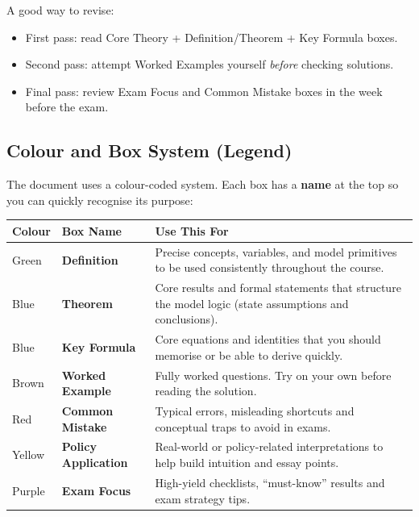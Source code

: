 \documentclass[12pt]{article}
\begin{document}
A good way to revise:
\begin{itemize}
\item First pass: read Core Theory + Definition/Theorem + Key Formula boxes.
\item Second pass: attempt Worked Examples yourself \emph{before} checking solutions.
\item Final pass: review Exam Focus and Common Mistake boxes in the week before the exam.
\end{itemize}

\subsection*{Colour and Box System (Legend)}

The document uses a colour-coded system. Each box has a \textbf{name} at the top so you can quickly recognise its purpose:

\begin{center}
\begin{tabular}{|l|l|p{7cm}|}
\hline
\textbf{Colour} & \textbf{Box Name} & \textbf{Use This For} \\
\hline
\colorbox{green!5}{Green} & \textbf{Definition} & Precise concepts, variables, and model primitives to be used consistently throughout the course. \\
\hline
\colorbox{blue!3}{Blue} & \textbf{Theorem} & Core results and formal statements that structure the model logic (state assumptions and conclusions). \\
\hline
\colorbox{blue!5}{Blue} & \textbf{Key Formula} & Core equations and identities that you should memorise or be able to derive quickly. \\
\hline
\colorbox{brown!5}{Brown} & \textbf{Worked Example} & Fully worked questions. Try on your own before reading the solution. \\
\hline
\colorbox{red!5}{Red} & \textbf{Common Mistake} & Typical errors, misleading shortcuts and conceptual traps to avoid in exams. \\
\hline
\colorbox{yellow!10}{Yellow} & \textbf{Policy Application} & Real-world or policy-related interpretations to help build intuition and essay points. \\
\hline
\colorbox{purple!5}{Purple} & \textbf{Exam Focus} & High-yield checklists, ``must-know'' results and exam strategy tips. \\
\hline
\end{tabular}
\end{center}
\end{document}
